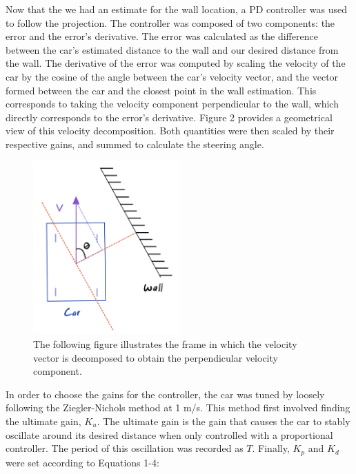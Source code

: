 \documentclass{article}
\begin{document}
Now that the we had an estimate for the wall location, a PD controller was used to follow the projection. The controller was composed of two components: the error and the error's derivative. The error was calculated as the difference between the car's estimated distance to the wall and our desired distance from the wall. The derivative of the error was computed by scaling the velocity of the car by the cosine of the angle between the car's velocity vector, and the vector formed between the car and the closest point in the wall estimation. This corresponds to taking the velocity component perpendicular to the wall, which directly corresponds to the error's derivative. Figure 2 provides a geometrical view of this velocity decomposition. Both quantities were then scaled by their respective gains, and summed to calculate the steering angle. 

\begin{figure}[h]
\begin{center}
\includegraphics[width=0.5\textwidth]{imgs/velocity_decomposition.png} %
\caption{The following figure illustrates the frame in which the velocity vector is decomposed to obtain the perpendicular velocity component.}
\end{center}
\end{figure}

In order to choose the gains for the controller, the car was tuned by loosely following the Ziegler-Nichols method at 1 {m/s}. This method first involved finding the ultimate gain, $K_u$. The ultimate gain is the gain that causes the car to stably oscillate around its desired distance when only controlled with a proportional controller. The period of this oscillation was recorded as $T$. Finally, $K_p$ and $K_d$ were set according to Equations 1-4:
\end{document}
